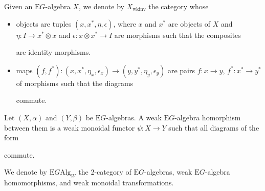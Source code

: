 \documentclass{amsart} %
\newenvironment{eq*}{\begin{equation*}}{\end{equation*}}
\begin{document}
\begin{defi} Given an $\mathrm{E}G$-algebra $X$, we denote by $X_{\mathrm{wkinv}}$ the category whose
\begin{itemize}
\item objects are tuples $(x, x^*, \eta, \epsilon)$, where $x$ and $x^*$ are objects of $X$ and $\eta: I \to x^* \otimes x$ and $\epsilon : x \otimes x^* \to I$ are morphisms such that the composites
\begin{eq*} 
\end{eq*}
are identity morphisms.
\item maps $(f, f^*): (x, x^*, \eta_x, \epsilon_x) \to (y, y^*, \eta_y, \epsilon_y)$ are pairs $f: x \to y$, $f^* : x^* \to y^*$ of morphisms such that the diagrams
\begin{eq*} 
\end{eq*}
commute.
\end{itemize}
\end{defi}

\begin{defi}\label{weakmonfunc} Let $(X, \alpha)$ and $(Y, \beta)$ be $\mathrm{E}G$-algebras. A weak $\mathrm{E}G$-algebra homorphism between them is a weak monoidal functor $\psi: X \to Y$ such that all diagrams of the form
\begin{eq*} 
\end{eq*}
commute.
\end{defi}

\begin{defi} We denote by $\mathrm{E}G\mathrm{Alg}_W$ the 2-category of $\mathrm{E}G$-algebras, weak $\mathrm{E}G$-algebra homomorphisms, and weak monoidal transformations.\end{defi}
\end{document}
